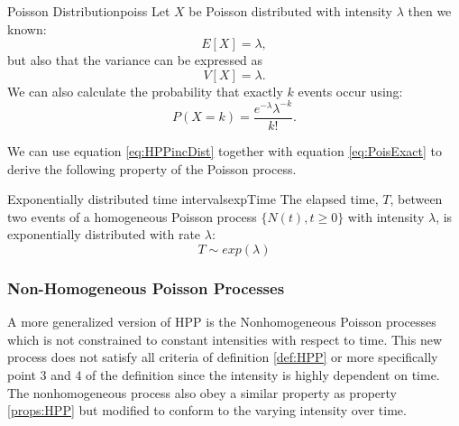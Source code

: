 \begin{properties}{Poisson Distribution}{poiss}
Let $X$ be Poisson distributed with intensity $\lambda$ then we known:
\begin{equation}
    E[X] = \lambda,
\label{eq:PoisE}
\end{equation}
but also that the variance can be expressed as
\begin{equation}
    V[X] = \lambda.
\label{eq:PoisV}
\end{equation}
We can also calculate the probability that exactly $k$ events occur using:
\begin{equation}
P\left(X=k\right)= \frac{e^{-\lambda} \lambda^{-k}}{k!}.
\label{eq:PoisExact}
\end{equation}
\end{properties}
We can use equation \ref{eq:HPPincDist} together with equation \ref{eq:PoisExact} to derive the following property of the Poisson process.
\begin{property}{Exponentially distributed time intervals}{expTime}
    The elapsed time, $T$, between two events of a homogeneous Poisson process $\{N(t),t\geq0\}$ with intensity $\lambda$, is exponentially distributed with rate $\lambda$:
    \begin{equation}
        T\sim exp(\lambda)
    \end{equation}
\end{property}

\subsubsection{Non-Homogeneous Poisson Processes}
A more generalized version of HPP is the Nonhomogeneous Poisson processes which is not constrained to constant intensities with respect to time. This new process does not satisfy all criteria of definition \ref{def:HPP} or more specifically point 3 and 4 of the definition since the intensity is highly dependent on time. The nonhomogeneous process also obey a similar property as property \ref{props:HPP} but modified to conform to the varying intensity over time.

